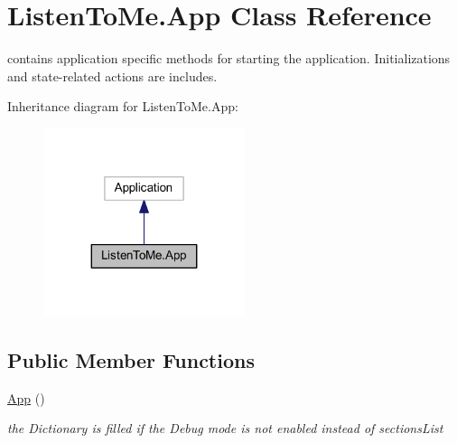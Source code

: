 \hypertarget{class_listen_to_me_1_1_app}{}\section{Listen\+To\+Me.\+App Class Reference}
\label{class_listen_to_me_1_1_app}


contains application specific methods for starting the application. Initializations and state-\/related actions are includes.  




Inheritance diagram for Listen\+To\+Me.\+App\+:\nopagebreak
\begin{figure}[H]
\begin{center}
\leavevmode
\includegraphics[width=167pt]{class_listen_to_me_1_1_app__inherit__graph}
\end{center}
\end{figure}
\subsection*{Public Member Functions}
\begin{DoxyCompactItemize}
\item 
\mbox{\hyperlink{class_listen_to_me_1_1_app_a8b865aa5eb8e0a1333c2b29f41bf4aa1}{App}} ()
\begin{DoxyCompactList}\small\item\em the Dictionary is filled if the Debug mode is not enabled instead of sections\+List \end{DoxyCompactList}\end{DoxyCompactItemize}
